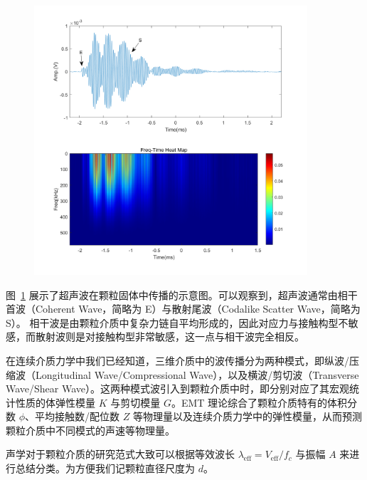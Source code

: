 \begin{figure}[!htp]
  \centering
  \includegraphics[height=10cm]{figures/1_heat_map.png}
  \label{fig:acoustic_signal}
\end{figure}

图~\ref{fig:acoustic_signal} 展示了超声波在颗粒固体中传播的示意图。可以观察到，超声波通常由相干首波（Coherent Wave，简略为 E）与散射尾波（Codalike Scatter Wave，简略为 S）。 相干波是由颗粒介质中复杂力链自平均形成的，因此对应力与接触构型不敏感，而散射波则是对接触构型非常敏感，这一点与相干波完全相反\cite{PhysRevLett.93.154303}。

在连续介质力学中我们已经知道，三维介质中的波传播分为两种模式，即纵波/压缩波（Longitudinal Wave/Compressional Wave），以及横波/剪切波（Transverse Wave/Shear Wave）。这两种模式波引入到颗粒介质中时，即分别对应了其宏观统计性质的体弹性模量 $K$ 与剪切模量 $G$。EMT 理论综合了颗粒介质特有的体积分数 $\phi$、平均接触数/配位数 $Z$ 等物理量以及连续介质力学中的弹性模量，从而预测颗粒介质中不同模式的声速等物理量。

声学对于颗粒介质的研究范式大致可以根据等效波长 $\lambda_{\text{eff}} = V_{\text{eff}}/f_{c}$ 与振幅 $A$ 来进行总结分类。为方便我们记颗粒直径尺度为 $d$。

